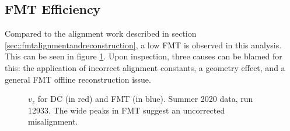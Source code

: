 \subsection{FMT Efficiency}
    Compared to the alignment work described in section \ref{sec::fmtalignmentandreconstruction}, a low FMT is observed in this analysis.
    This can be seen in figure \ref{fig::vz_012933}.
    Upon inspection, three causes can be blamed for this: the application of incorrect alignment constants, a geometry effect, and a general FMT offline reconstruction issue.

    \begin{figure}[b!]
        \centering{}
        \caption[$v_z$ for DC and FMT, run 12933]{$v_z$ for DC (in red) and FMT (in blue). Summer 2020 data, run 12933. The wide peaks in FMT suggest an uncorrected misalignment.}
        \label{fig::vz_012933}
    \end{figure}

    
    
    
    
